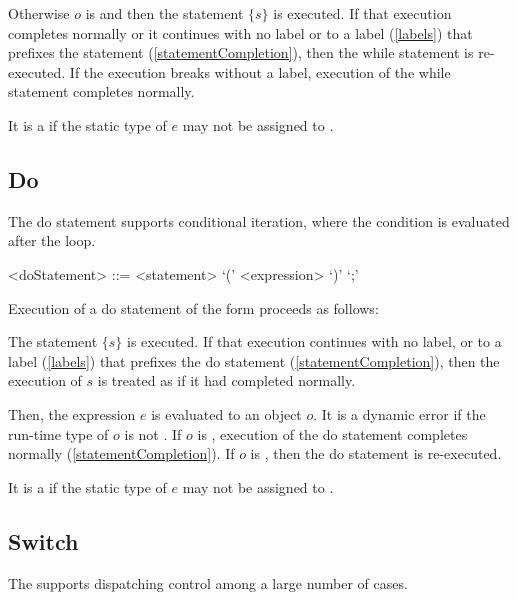 \documentclass[makeidx]{article}
\begin{document}
{\LMHash{}%
Otherwise $o$ is \TRUE{} and then the statement $\{s\}$ is executed.
If that execution completes normally or it continues with no label
or to a label (\ref{labels}) that prefixes the \WHILE{} statement
(\ref{statementCompletion}),
then the while statement is re-executed.
If the execution breaks without a label,
execution of the while statement completes normally.

\LMHash{}%
It is a  if
the static type of $e$ may not be assigned to .


\subsection{Do}

\LMHash{}%
The do statement supports conditional iteration,
where the condition is evaluated after the loop.

\begin{grammar}
<doStatement> ::= \DO{} <statement> \WHILE{} `(' <expression> `)' `;'
\end{grammar}

\LMHash{}%
Execution of a do statement of the form 
proceeds as follows:

\LMHash{}%
The statement $\{s\}$ is executed.
If that execution continues with no label,
or to a label (\ref{labels}) that prefixes the do statement
(\ref{statementCompletion}),
then the execution of $s$ is treated as if it had completed normally.

\LMHash{}%
Then, the expression $e$ is evaluated to an object $o$.
It is a dynamic error if the run-time type of $o$ is not .
If $o$ is \FALSE, execution of the do statement completes normally
(\ref{statementCompletion}).
If $o$ is \TRUE, then the do statement is re-executed.

\LMHash{}%
It is a  if the static type of $e$
may not be assigned to .


\subsection{Switch}

\LMHash{}%
The  supports dispatching control among
a large number of cases.

}
\end{document}
